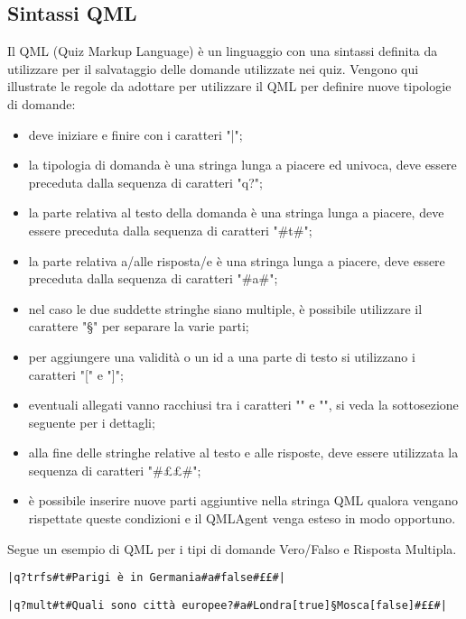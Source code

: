 \documentclass[a4paper, titlepage]{article}
\begin{document}
	\subsection{Sintassi QML}
	Il QML (Quiz Markup Language) è un linguaggio con una sintassi definita da utilizzare per il salvataggio delle domande utilizzate nei quiz.
	Vengono qui illustrate le regole da adottare per utilizzare il QML per definire nuove tipologie di domande:
	\begin{itemize}
		\item deve iniziare e finire con i caratteri "|";
		\item la tipologia di domanda è una stringa lunga a piacere ed univoca, deve essere preceduta dalla sequenza di caratteri "q?";
		\item la parte relativa al testo della domanda è una stringa lunga a piacere, deve essere preceduta dalla sequenza di caratteri "\#t\#";
		\item la parte relativa a/alle risposta/e è una stringa lunga a piacere, deve essere preceduta dalla sequenza di caratteri "\#a\#";
		\item nel caso le due suddette stringhe siano multiple, è possibile utilizzare il carattere "§" per separare la varie parti;
		\item per aggiungere una validità o un id a una parte di testo si utilizzano i caratteri "[" e "]";
		\item eventuali allegati vanno racchiusi tra i caratteri "{" e "}", si veda la sottosezione seguente per i dettagli;
		\item alla fine delle stringhe relative al testo e alle risposte, deve essere utilizzata la sequenza di caratteri "\#££\#";
		\item è possibile inserire nuove parti aggiuntive nella stringa QML qualora vengano rispettate queste condizioni e il QMLAgent venga esteso in modo opportuno.
	\end{itemize}
	Segue un esempio di QML per i tipi di domande Vero/Falso e Risposta Multipla.
	\begin{verbatim}|q?trfs#t#Parigi è in Germania#a#false#££#|\end{verbatim}
	\begin{verbatim}|q?mult#t#Quali sono città europee?#a#Londra[true]§Mosca[false]#££#|\end{verbatim}
	
\end{document}
